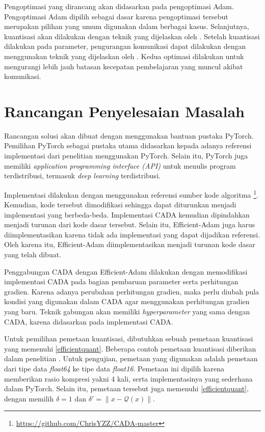 Pengoptimasi yang dirancang akan didasarkan pada pengoptimasi Adam. Pengoptimasi Adam dipilih sebagai dasar karena pengoptimasi tersebut merupakan pilihan yang umum digunakan dalam berbagai kasus. Selanjutnya, kuantisasi akan dilakukan dengan teknik yang dijelaskan oleh \textcite{Chen2021CADA}. Setelah kuantisasi dilakukan pada parameter, pengurangan komunikasi dapat dilakukan dengan menggunakan teknik yang dijelaskan oleh \textcite{Chen2022Efficient}. Kedua optimasi dilakukan untuk mengurangi lebih jauh batasan kecepatan pembelajaran yang muncul akibat komunikasi.

\section{Rancangan Penyelesaian Masalah}
Rancangan solusi akan dibuat dengan menggunakan bantuan pustaka PyTorch. Pemilihan PyTorch sebagai pustaka utama didasarkan kepada adanya referensi implementasi dari penelitian \textcite{Chen2021CADA} menggunakan PyTorch. Selain itu, PyTorch juga memiliki \emph{application programming interface (API)} untuk menulis program terdistribusi, termasuk \emph{deep learning} terdistribusi.

Implementasi dilakukan dengan menggunakan referensi sumber kode algoritma \textcite{Chen2021CADA}\footnote{\url{https://github.com/ChrisYZZ/CADA-master}}. Kemudian, kode tersebut dimodifikasi sehingga dapat diturunkan menjadi implementasi yang berbeda-beda. Implementasi CADA kemudian dipindahkan menjadi turunan dari kode dasar tersebut. Selain itu, Efficient-Adam juga harus diimplementasikan karena tidak ada implementasi yang dapat dijadikan referensi. Oleh karena itu, Efficient-Adam diimplementasikan menjadi turunan kode dasar yang telah dibuat.

Penggabungan CADA dengan Efficient-Adam dilakukan dengan memodifikasi implementasi CADA pada bagian pembaruan parameter serta perhitungan gradien. Karena adanya perubahan perhitungan gradien, maka perlu diubah pula kondisi yang digunakan dalam CADA agar menggunakan perhitungan gradien yang baru. Teknik gabungan akan memiliki \emph{hyperparameter} yang sama dengan CADA, karena didasarkan pada implementasi CADA.

Untuk pemilihan pemetaan kuantisasi, dibutuhkan sebuah pemetaan kuantisasi yang memenuhi \autoref{efficientquant}. Beberapa contoh pemetaan kuantisasi diberikan dalam penelitian \textcite{Chen2022Efficient}. Untuk pengujian, pemetaan yang digunakan adalah pemetaan dari tipe data \emph{float64} ke tipe data \emph{float16}. Pemetaan ini dipilih karena memberikan rasio kompresi yakni 4 kali, serta implementasinya yang sederhana dalam PyTorch. Selain itu, pemetaan tersebut juga memenuhi \autoref{efficientquant}, dengan memilih $\delta = 1$ dan $\delta' = \|x - \mathcal{Q}(x)\|$.
